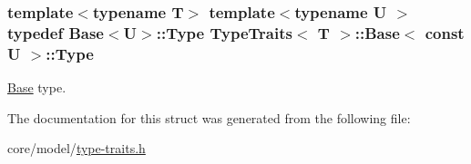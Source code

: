 \subsubsection[{\texorpdfstring{Type}{Type}}]{\setlength{\rightskip}{0pt plus 5cm}template$<$typename T$>$ template$<$typename U $>$ typedef {\bf Base}$<$U$>$\+::{\bf Type} {\bf Type\+Traits}$<$ T $>$\+::{\bf Base}$<$ const U $>$\+::{\bf Type}}\hypertarget{structTypeTraits_1_1Base_3_01const_01U_01_4_a815dddf4b225074ee2895fd628447bd9}{}\label{structTypeTraits_1_1Base_3_01const_01U_01_4_a815dddf4b225074ee2895fd628447bd9}
\hyperlink{structTypeTraits_1_1Base}{Base} type. 

The documentation for this struct was generated from the following file\+:\begin{DoxyCompactItemize}
\item 
core/model/\hyperlink{type-traits_8h}{type-\/traits.\+h}\end{DoxyCompactItemize}
